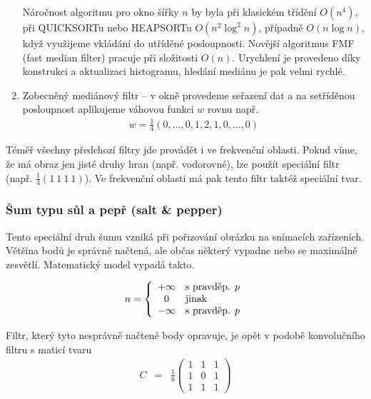 \begin{enumerate}
Náročnost algoritmu
pro okno šířky $n$ by byla při klasickém třídění $O(n^4)$, při QUICKSORTu nebo HEAPSORTu $O(n^2\log^2 n)$, případně
$O(n\log n)$, když využijeme vkládání do utříděné posloupnosti. Novější algoritmus FMF (fast median filter) pracuje při
složitosti $O(n)$. Urychlení je provedeno díky konstrukci a aktualizaci histogramu, hledání mediánu je pak velmi rychlé.

\item Zobecněný mediánový filtr -- v okně provedeme seřazení dat a na setříděnou posloupnost aplikujeme váhovou funkci $w$
 rovnu např. 
\begin{eqnarray}
w=\frac{1}{4}(0,\dots,0,1,2,1,0,\dots,0)
\end{eqnarray}
\end{enumerate}


Téměř všechny předchozí filtry jde provádět i ve frekvenční oblasti. Pokud víme, že má obraz jen jisté druhy
hran (např. vodorovné), lze použít speciální filtr (např. $\frac{1}{4}(1\ 1\ 1\ 1)$). Ve frekvenční oblasti
má pak tento filtr taktéž speciální tvar.

\subsubsection{Šum typu sůl a pepř (salt \& pepper)}

Tento speciální druh šumu vzniká při pořizování obrázku na snímacích zařízeních. Většina bodů je správně načtená, ale 
občas některý vypadne nebo se maximálně zesvětlí. Matematický model vypadá takto.

\begin{equation}
n=\left\{\begin{array}{cl}+\infty&\hbox{s pravděp. $p$}\\
0&\hbox{jinak}\\-\infty&\hbox{s pravděp. $p$}
\end{array}\right.
\end{equation}

Filtr, který tyto nesprávně načtené body opravuje, je opět v podobě konvolučního filtru s maticí tvaru
\begin{eqnarray}
C&=&\frac{1}{8}\left(\begin{array}{ccc}1&1&1\\1&0&1\\1&1&1\end{array}\right)
\end{eqnarray}

